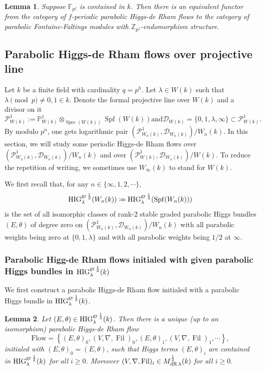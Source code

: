 \documentclass[12pt,twoside]{book}
\theoremstyle{plain}
\newtheorem{lemma}[lemma]{Lemma}
\theoremstyle{definition}
\theoremstyle{remark}
\newcommand{\bF}{{\mathbb F}}
\newcommand{\bP}{{\mathbb P}}
\newcommand{\bZ}{{\mathbb Z}}
\newcommand{\mD}{{\mathcal D}}
\newcommand{\mP}{{\mathcal P}}
\DeclareMathOperator\Fil{Fil}
\DeclareMathOperator\Spec{Spec}
\DeclareMathOperator\Spf{Spf}
\numberwithin{equation}{section}
\def\High{{\mathrm{HIG}^{{\rm gr}\,{1\over 2}}_{\lambda}}}
\def\MdRh{{M^{{1\over 2}}_{{\rm dR}\,\lambda}}}
\def\Flow{\mathrm{Flow}}
\begin{document}
\begin{lemma} \label{thm_equFunctorHdRF&FFMod} Suppose $\bF_{p^f}$ is contained in $k$. Then there is an equivalent functor from the category of $f$-periodic parabolic Higgs-de Rham flows to the category of parabolic Fontaine-Faltings modules with $\bZ_{p^f}$-endomorphism structure.
\end{lemma}



\newpage

\subsection{Parabolic Higgs-de Rham flows over projective line}

Let $k$ be a finite field with cardinality $q=p^{h}$. Let $\lambda \in W(k)$ such that $\lambda\pmod{p}\neq 0,1\in k$. Denote the formal projective line over $W(k)$ and a divisor on it
\[\mP^1_{W(k)}:=\bP^1_{W(k)}\otimes_{\Spec(W(k))}\Spf(W(k)) \text{and} \mD_{W(k)}=\{0,1,\lambda,\infty\}\subset\mP^1_{W(k)}.\]
By modulo $p^n$, one gets logarithmic pair $(\mP^1_{W_n(k)},\mD_{W_n(k)})/W_n(k)$. In this section, we will study some periodic Higgs-de Rham flows over $(\mP^1_{W_n(k)},\mD_{W_n(k)})/W_n(k)$ and over $(\mP^1_{W(k)},\mD_{W_n(k)})/W(k)$. To reduce the repetition of writing, we sometimes use $W_\infty(k)$ to stand for $W(k)$.

We first recall that, for any $n\in\{\infty,1,2,\cdots\}$, \[\High(W_n(k))\coloneqq\High(\Spf(W_n(k)))\]
is the set of all isomorphic classes of rank-$2$ stable graded parabolic Higgs bundles $(E,\theta)$ of degree zero on $(\mP^1_{W_n(k)},\mD_{W_n(k)})/W_n(k)$ with all parabolic weights being zero at $\{0,1,\lambda\}$ and with all parabolic weights being $1/2$ at $\infty$.

\subsubsection{Parabolic Higg-de Rham flows initialed with given parabolic Higgs bundles in $\High(k)$}

We first construct a parabolic Higgs-de Rham flow initialed with a parabolic Higgs bundle in $\High(k)$.

\begin{lemma} \label{thm_Higgs2HDF_k}
Let $(E,\theta) \in \High(k)$. Then there is a unique (up to an isomorphism) parabolic Higgs-de Rham flow
\[\Flow = \left\{
(E,\theta)_{0},
(V,\nabla,\Fil)_{0},
(E,\theta)_{1},
(V,\nabla,\Fil)_{1},
\cdots\right\},\]
initialed with $(E,\theta)_0=(E,\theta)$, such that Higgs terms $(E,\theta)_{i}$ are contained in $\High(k)$ for all $i\geq 0$.
Moreover $(V,\nabla,\Fil)_{i}\in\MdRh(k)$ for all $i\geq 0$.
\end{lemma}
\end{document}
